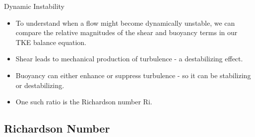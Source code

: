 \begin{frame}{Dynamic Instability}
\begin{itemize}
	\item To understand when a flow might become dynamically unstable, we can compare the relative magnitudes of the shear and buoyancy terms in our TKE balance equation.
	\item Shear leads to mechanical production of turbulence - a destabilizing effect.
	\item Buoyancy can either enhance or suppress turbulence - so it can be stabilizing or destabilizing.
	\item One such ratio is the Richardson number Ri.
\end{itemize}
\end{frame}
\subsection{Richardson Number}

